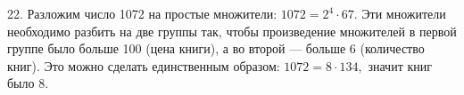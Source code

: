 22. Разложим число 1072 на простые множители: $1072=2^4\cdot67.$ Эти множители необходимо разбить на две группы так, чтобы произведение множителей в первой группе было больше 100 (цена книги), а во второй --- больше 6 (количество книг). Это можно сделать единственным образом: $1072=8\cdot134,$ значит книг было 8.\\
